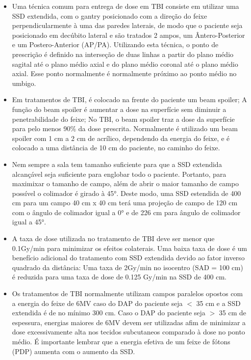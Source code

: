 \documentclass[11pt,a4paper]{article}
\newcounter{exemplo}
\begin{document}
\begin{exemplo}
\begin{itemize}
        \item Uma técnica comum para entrega de dose em TBI consiste em utilizar uma SSD extendida, com o gantry posicionado com a direção do feixe perpendicularmente à uma das paredes laterais, de modo que o paciente seja posicionado em decúbito lateral e são tratados 2 ampos, um Ântero-Posterior e um Postero-Anterior (AP/PA). Utilizando esta técnica, o ponto de prescrição é definido na interseção de duas linhas a partir do plano médio sagital até o plano médio axial e do plano médio coronal até o plano médio axial. Esse ponto normalmente é normalmente próximo ao ponto médio no umbigo.
        
        \item Em tratamentos de TBI, é colocado na frente do paciente um beam spoiler; A função do beam spoiler é aumentar a dose na superfície sem diminuir a penetrabilidade do feixe; No TBI, o beam spoiler traz a dose da superfície para pelo menos 90\% da dose prescrita. Normalmente é utilizado um beam spoiler com 1 cm a 2 cm de acrílico, dependendo da energia do feixe, e é colocado a uma distância de 10 cm do paciente, no caminho do feixe.
        
        \item Nem sempre a sala tem tamanho suficiente para que a SSD extendida alcançável seja suficiente para englobar todo o paciente. Portanto, para maximixar o tamanho de campo, além de abrir o maior tamanho de campo possível o colimador é girado à \ang{45}. Deste modo, uma SSD estendida de 400 cm para um campo 40 cm x 40 cm terá uma projeção de campo de 120 cm com o ângulo de colimador igual a \ang{0} e de 226 cm para ângulo de colimador igual a \ang{45}.
        
        \item A taxa de dose utilizada no tratamento de TBI deve ser menor que 0.1Gy/min para minimizar os efeitos colaterais. Uma baixa taxa de dose é um benefício adicional do tratamento com SSD extendida devido ao fator inverso quadrado da distância: Uma taxa de 2Gy/min no isocentro (SAD = 100 cm) é reduzida para uma taxa de dose de 0.125 Gy/min na SSD de 400 cm.
        
        \item Os tratamentos de TBI normalmente utilizam campos paralelos opostos com a energia do feixe de 6MV caso do DAP do paciente seja $<$ 35 cm e a SSD extendida é de no mínimo 300 cm. Caso o DAP do paciente seja $>$ 35 cm de espessura, energias maiores de 6MV devem ser utilizadas afim de minimizar a dose excessivamente alta nos tecidos subcutaneos comparado à dose no ponto médio. É importante lembrar que a energia efetiva de um feixe de fótons (PDP) aumenta com o aumento da SSD.
        

\end{itemize}
\end{exemplo}
\end{document}
